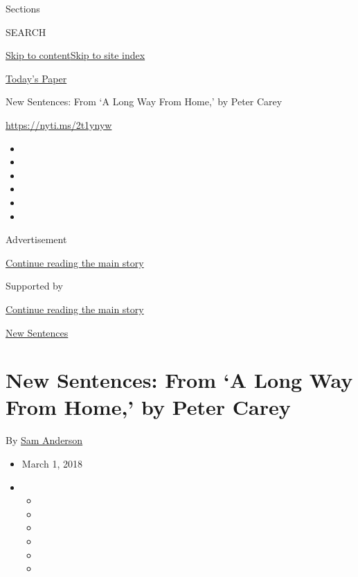 Sections

SEARCH

\protect\hyperlink{site-content}{Skip to
content}\protect\hyperlink{site-index}{Skip to site index}

\href{https://myaccount.nytimes3xbfgragh.onion/auth/login?response_type=cookie\&client_id=vi}{}

\href{https://www.nytimes3xbfgragh.onion/section/todayspaper}{Today's
Paper}

New Sentences: From `A Long Way From Home,' by Peter Carey

\url{https://nyti.ms/2t1ynyw}

\begin{itemize}
\item
\item
\item
\item
\item
\item
\end{itemize}

Advertisement

\protect\hyperlink{after-top}{Continue reading the main story}

Supported by

\protect\hyperlink{after-sponsor}{Continue reading the main story}

\href{/column/new-sentences}{New Sentences}

\hypertarget{new-sentences-from-a-long-way-from-home-by-peter-carey}{%
\section{New Sentences: From `A Long Way From Home,' by Peter
Carey}\label{new-sentences-from-a-long-way-from-home-by-peter-carey}}

By \href{http://www.nytimes3xbfgragh.onion/by/sam-anderson}{Sam
Anderson}

\begin{itemize}
\item
  March 1, 2018
\item
  \begin{itemize}
  \item
  \item
  \item
  \item
  \item
  \item
  \end{itemize}
\end{itemize}


